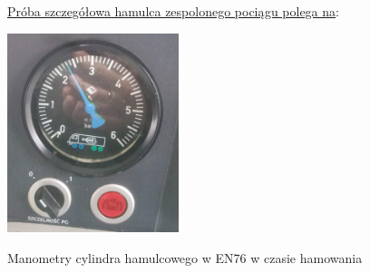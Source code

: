\underline{Próba szczegółowa hamulca zespolonego pociągu polega na}: 
\begin{marginfigure}
	\includegraphics[width=5cm]{skryptkierownik-img/manometry-zahamowane-ep.jpg}
	\caption{Manometry cylindra hamulcowego w EN76 w czasie hamowania}
\end{marginfigure}
